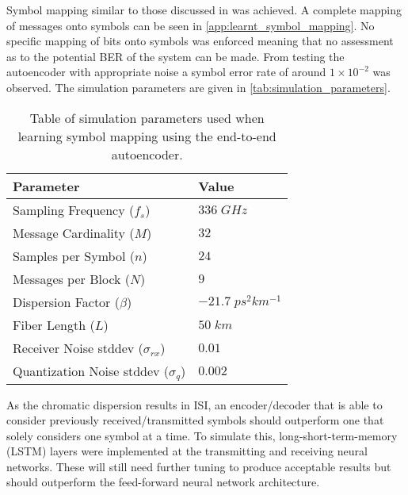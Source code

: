         Symbol mapping similar to those discussed in \autocite{8433895} was achieved. A complete mapping of messages onto symbols can be seen in \autoref{app:learnt_symbol_mapping}. No specific mapping of bits onto symbols was enforced meaning that no assessment as to the potential BER of the system can be made. From testing the autoencoder with appropriate noise a symbol error rate of around $1\times10^{-2}$ was observed. The simulation parameters are given in \autoref{tab:simulation_parameters}.
        \\
        \begin{table}[H]
            \centering
            \begin{tabular}{ll}
                \textbf{Parameter}                              & \textbf{Value}            \\ \hline
                Sampling Frequency ($f_{s}$)                    & $336\;GHz$                 \\
                Message Cardinality ($M$)                       & $32$                      \\
                Samples per Symbol ($n$)                        & $24$                      \\
                Messages per Block ($N$)                        & $9$                       \\
                Dispersion Factor ($\beta$)                     & $-21.7\;ps^{2}km^{-1}$     \\
                Fiber Length ($L$)                              & $50\;km$                   \\
                Receiver Noise stddev ($\sigma_{rx}$)            & $0.01$                    \\
                Quantization Noise stddev ($\sigma_{q}$)        & $0.002$
            \end{tabular}
            \caption{Table of simulation parameters used when learning symbol mapping using the end-to-end autoencoder.}
            \label{tab:simulation_parameters}
        \end{table}
        
        As the chromatic dispersion results in ISI, an encoder/decoder that is able to consider previously received/transmitted symbols should outperform one that solely considers one symbol at a time. To simulate this, long-short-term-memory (LSTM) layers were implemented at the transmitting and receiving neural networks. These will still need further tuning to produce acceptable results but should outperform the feed-forward neural network architecture.
    
